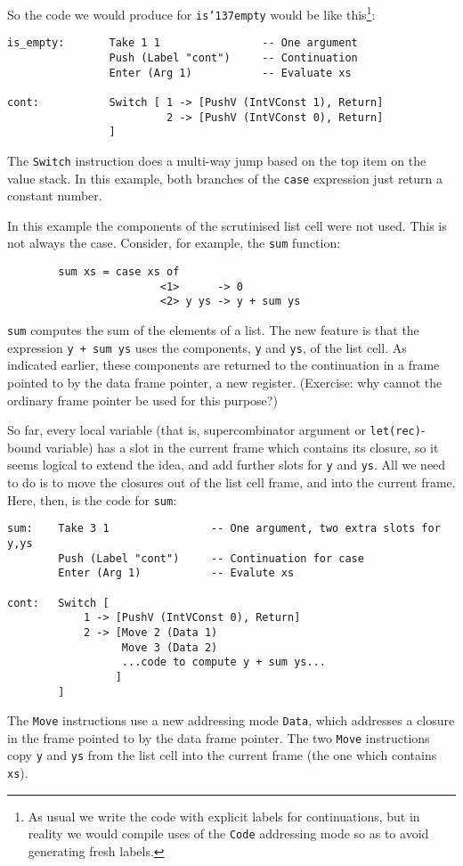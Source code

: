 So the code we would produce for \mbox{\tt is{\char'137}empty} would be like this\footnote{%
As usual we write the code with explicit labels for continuations,
but in reality we
would compile uses of the \mbox{\tt Code} addressing mode so as to avoid generating
fresh labels.
}:
\begin{verbatim}
is_empty:       Take 1 1                -- One argument
                Push (Label "cont")     -- Continuation
                Enter (Arg 1)           -- Evaluate xs

cont:           Switch [ 1 -> [PushV (IntVConst 1), Return]
                         2 -> [PushV (IntVConst 0), Return]
                ]
\end{verbatim}
The \mbox{\tt Switch} instruction does a multi-way jump based on the top item on the
value stack.  In this example,
both branches of the \mbox{\tt case} expression just return
a constant number.

In this example the components of the scrutinised list cell were not
used.  This is not always the case.  Consider, for example, the \mbox{\tt sum} function:
\begin{verbatim}
        sum xs = case xs of
                        <1>      -> 0
                        <2> y ys -> y + sum ys
\end{verbatim}
\mbox{\tt sum} computes the sum of the elements of a list.  The new feature is that
the expression \mbox{\tt y\ +\ sum\ ys} uses the components, \mbox{\tt y} and \mbox{\tt ys},  of the
list cell.  As indicated earlier, these
components are returned to the continuation in a frame
pointed to by the data frame pointer, a new register.  (Exercise: why
cannot the ordinary frame pointer be used for this purpose?)

So far, every local variable (that is, supercombinator argument
or \mbox{\tt let(rec)}-bound variable) has a slot in the current frame which contains
its closure, so it seems logical to extend the idea, and add further slots
for \mbox{\tt y} and \mbox{\tt ys}.  All we need to do is to move the closures out of the
list cell frame, and into the current frame.  Here, then, is the code for
\mbox{\tt sum}:
\begin{verbatim}
sum:    Take 3 1                -- One argument, two extra slots for y,ys
        Push (Label "cont")     -- Continuation for case
        Enter (Arg 1)           -- Evalute xs

cont:   Switch [
            1 -> [PushV (IntVConst 0), Return]
            2 -> [Move 2 (Data 1)
                  Move 3 (Data 2)
                  ...code to compute y + sum ys...
                 ]
        ]
\end{verbatim}
The \mbox{\tt Move} instructions use a new addressing mode \mbox{\tt Data}, which
addresses a
closure in the frame pointed to by the data frame pointer.
The two \mbox{\tt Move} instructions copy \mbox{\tt y} and \mbox{\tt ys} from the list cell into
the current frame (the one which contains \mbox{\tt xs}).

